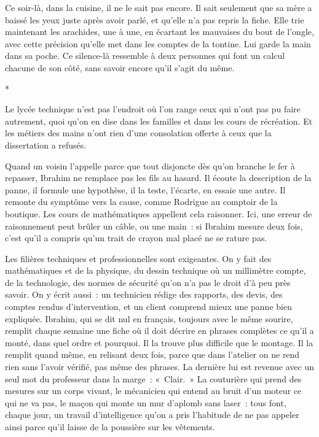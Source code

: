 \documentclass[10.5pt,twoside,openright]{book}
\newcommand{\asterisme}{\par\vspace{0.7em}\centerline{\color{gris}*\quad*\quad*}\vspace{0.7em}\par\noindent}
\begin{document}
Ce soir-là, dans la cuisine, il ne le sait pas encore. Il sait seulement que sa mère a baissé les yeux juste après avoir parlé, et qu’elle n’a pas repris la fiche. Elle trie maintenant les arachides, une à une, en écartant les mauvaises du bout de l’ongle, avec cette précision qu’elle met dans les comptes de la tontine. Lui garde la main dans sa poche. Ce silence-là ressemble à deux personnes qui font un calcul chacune de son côté, sans savoir encore qu’il s’agit du même.

\asterisme

Le lycée technique n’est pas l’endroit où l’on range ceux qui n’ont pas pu faire autrement, quoi qu’on en dise dans les familles et dans les cours de récréation. Et les métiers des mains n’ont rien d’une consolation offerte à ceux que la dissertation a refusés.

Quand un voisin l’appelle parce que tout disjoncte dès qu’on branche le fer à repasser, Ibrahim ne remplace pas les fils au hasard. Il écoute la description de la panne, il formule une hypothèse, il la teste, l’écarte, en essaie une autre. Il remonte du symptôme vers la cause, comme Rodrigue au comptoir de la boutique. Les cours de mathématiques appellent cela raisonner. Ici, une erreur de raisonnement peut brûler un câble, ou une main : si Ibrahim mesure deux fois, c’est qu’il a compris qu’un trait de crayon mal placé ne se rature pas.

Les filières techniques et professionnelles sont exigeantes. On y fait des mathématiques et de la physique, du dessin technique où un millimètre compte, de la technologie, des normes de sécurité qu’on n’a pas le droit d’à peu près savoir. On y écrit aussi : un technicien rédige des rapports, des devis, des comptes rendus d’intervention, et un client comprend mieux une panne bien expliquée. Ibrahim, qui se dit nul en français, toujours avec le même sourire, remplit chaque semaine une fiche où il doit décrire en phrases complètes ce qu’il a monté, dans quel ordre et pourquoi. Il la trouve plus difficile que le montage. Il la remplit quand même, en relisant deux fois, parce que dans l’atelier on ne rend rien sans l’avoir vérifié, pas même des phrases. La dernière lui est revenue avec un seul mot du professeur dans la marge : « Clair. » La couturière qui prend des mesures sur un corps vivant, le mécanicien qui entend au bruit d’un moteur ce qui ne va pas, le maçon qui monte un mur d’aplomb sans laser : tous font, chaque jour, un travail d’intelligence qu’on a pris l’habitude de ne pas appeler ainsi parce qu’il laisse de la poussière sur les vêtements.
\end{document}
